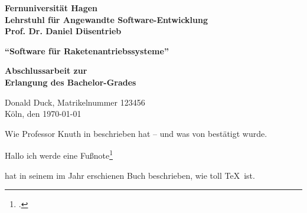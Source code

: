 \documentclass[12pt,ngerman,parskip=half]{scrreport}
\begin{document}
\begin{titlepage}
\textbf{\large Fernuniversität Hagen \\
Lehrstuhl für Angewandte Software-Entwicklung \\
Prof. Dr. Daniel Düsentrieb}\vspace*{4cm}

\begin{center}
\textbf{\huge \enquote{Software für Raketenantriebssysteme}}
\end{center}\vspace*{2cm}


\begin{center}
\textbf{\Large Abschlussarbeit zur \\
Erlangung des Bachelor-Grades}
\end{center}

\vfill
Donald Duck, Matrikelnummer 123456 \\
Köln, den \today
\end{titlepage}


\tableofcontents

\listoffigures

\listoftables








Wie Professor Knuth in \cite{Duck2023} beschrieben hat -- und was von \cite{Knuth1984} bestätigt wurde.

\cite{Cao2021}

\parencite{Knuth1984}

Hallo ich werde eine Fußnote\footcite{Knuth1984}

\citeauthor{Knuth1984} hat in seinem im Jahr \citeyear{Knuth1984} erschienen Buch  beschrieben, wie toll \TeX\ ist.

\printbibliography %
\end{document}
